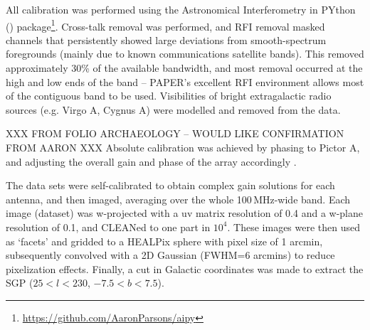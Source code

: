 \documentclass[useAMS,usenatbib]{mn2e}
\begin{document}
All calibration was performed using the Astronomical Interferometry in PYthon ({}) package\footnote{\url{https://github.com/AaronParsons/aipy}}.
Cross-talk removal was performed, and RFI removal masked channels that persistently showed large deviations from smooth-spectrum foregrounds (mainly due to known communications satellite bands). This removed approximately 30\% of the available bandwidth, and most removal occurred at the high and low ends of the band -- PAPER's excellent RFI environment allows most of the contiguous band to be used. Visibilities of bright extragalactic radio sources (e.g. Virgo A, Cygnus A) were modelled and removed from the data. 

XXX FROM FOLIO ARCHAEOLOGY -- WOULD LIKE CONFIRMATION FROM AARON XXX
Absolute calibration was achieved by phasing to Pictor A, and adjusting the overall gain and phase of the array accordingly \citep{Jacobs.13}.

The data sets were self-calibrated to obtain complex gain solutions for each antenna, and then imaged, averaging over the whole 100\,MHz-wide band. Each image (dataset) was w-projected with a uv matrix resolution of 0.4 and a w-plane resolution of 0.1, and CLEANed \citep{Clark.80} to one part in $10^4$. These images were then used as `facets' and gridded to a HEALPix \citep{Gorski.05, Gorski.11} sphere with pixel size of 1 arcmin, subsequently convolved with a 2D Gaussian (FWHM=6 arcmins) to reduce pixelization effects. Finally, a cut in Galactic coordinates was made to extract the SGP ($25<l<230$, $-7.5<b<7.5$).
\end{document}
